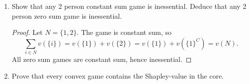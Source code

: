 \documentclass[10pt]{article}
\begin{document}
\begin{enumerate}
\begin{proof}
\begin{enumerate}
\begin{proof}
Suppose $|S| = 0$.  Then $S = \emptyset$.  Recall that these linear combinations must hold for all $T \subseteq N$, thus they must hold in particular for $T = \emptyset$.  So
$$
\sum\limits_{S \subseteq N} c_S'w_S(\emptyset) = \sum\limits_{S \subseteq N} c_Sw_S(\emptyset)
\implies
\sum\limits_{S \subseteq \emptyset} c_S' = \sum\limits_{S \subseteq \emptyset} c_S
\implies
c'_{\emptyset} = c_{\emptyset}.
$$
Next, suppose the proposition holds for all $S$ such that $|S| < |T|$ for some $T \subseteq N$.  Then we may apply the equation to $T$, giving
$$
\sum\limits_{S \subseteq N} c_S'w_S(T) = \sum\limits_{S \subseteq N} c_Sw_S(T)
\implies
\sum\limits_{S \subseteq T} c_S' = \sum\limits_{S \subseteq T} c_S
$$
$$
\implies
\sum\limits_{S \subsetneq T} c_S' + c_T'
 = \sum\limits_{S \subsetneq T} c_S + c_T
\implies
c'_{T} = c_{T}
$$
by the inductive hypothesis.  Therefore, the linear combination is unique.
\end{proof}
\item For any such $v = \sum_{S \subseteq N} c_S w_S$, $\phi_i(v) = \sum\limits_{S \subseteq N \setminus \{ i\}} \dfrac{c_S}{|S|}$.
\begin{proof}
This follows immediately from the additivity axiom:
$$
\phi_i(v) = \phi_i(\sum\limits_{S \subseteq N} c_Sw_S) = \sum\limits_{S \subseteq N} \phi_i(c_Sw_S) = \sum\limits_{S \subseteq N} \frac{c_S}{|S|}\mathbbm{1}(i \in S) = \sum\limits_{S \subseteq N \setminus \{i\}} \frac{c_S}{|S|}.
$$
\end{proof}
Therefore, there is a unique function satisfying the Shapley axioms.  Since we have shown in lecture that $\varphi_i$ satisfies these axioms, it must be this unique function.
\end{enumerate}



\end{proof}
\pagebreak
\item Show that any 2 person constant sum game is inessential.  Deduce that any 2 person zero sum game is inessential.

\begin{proof}
Let $N = \{1,2\}$.  The game is constant sum, so
$$
\sum\limits_{i \in N} v(\{i\}) = v(\{1\}) + v(\{2\}) = v(\{1\}) + v(\{1\}^C) = v(N).
$$
All zero sum games are constant sum, hence inessential.
\end{proof}

\item Prove that every convex game contains the Shapley-value in the core.


\end{enumerate}
\end{document}
